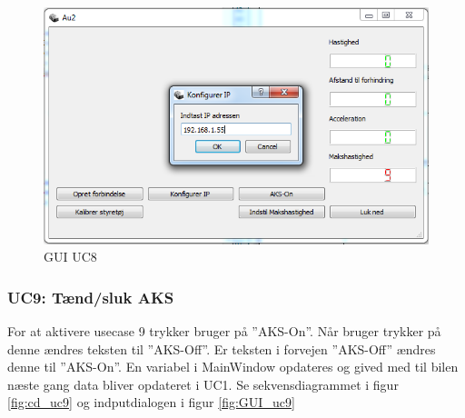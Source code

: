 \begin{figure}[H]
\centering
\includegraphics[width=\textwidth* 3/4,height=\textwidth* 9/20 ]{../fig/billeder/gui_uc8.png}
\caption{GUI UC8}
\label{fig:GUI_uc8}
\end{figure}

\subsubsection{UC9: Tænd/sluk AKS}
For at aktivere usecase 9 trykker bruger på ''AKS-On''.
Når bruger trykker på denne ændres teksten til ''AKS-Off''. Er teksten i forvejen ''AKS-Off'' ændres denne til ''AKS-On''. En variabel i MainWindow opdateres og gived med til bilen næste gang data bliver opdateret i UC1. Se sekvensdiagrammet i figur \ref{fig:cd_uc9} og indputdialogen i figur \ref{fig:GUI_uc9}

